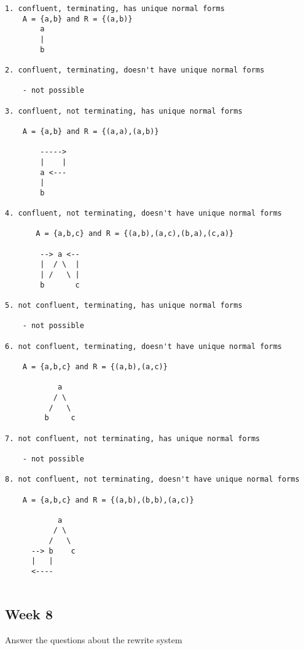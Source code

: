 \documentclass{article}
\theoremstyle{theorem}
\theoremstyle{definition}
\theoremstyle{remark}
\begin{document}
\begin{lstlisting}
1. confluent, terminating, has unique normal forms
    A = {a,b} and R = {(a,b)}
        a
        |
        b

2. confluent, terminating, doesn't have unique normal forms

    - not possible

3. confluent, not terminating, has unique normal forms

    A = {a,b} and R = {(a,a),(a,b)}
        
        ----->
        |    |
        a <---
        |
        b

4. confluent, not terminating, doesn't have unique normal forms

       A = {a,b,c} and R = {(a,b),(a,c),(b,a),(c,a)}
        
        --> a <--
        |  / \  |
        | /   \ |
        b       c

5. not confluent, terminating, has unique normal forms

    - not possible

6. not confluent, terminating, doesn't have unique normal forms

    A = {a,b,c} and R = {(a,b),(a,c)}
        
            a
           / \
          /   \
         b     c

7. not confluent, not terminating, has unique normal forms

    - not possible

8. not confluent, not terminating, doesn't have unique normal forms

    A = {a,b,c} and R = {(a,b),(b,b),(a,c)}
        
            a
           / \
          /   \
      --> b    c
      |   |
      <----


\end{lstlisting}
%

\subsection{Week 8}
Answer the questions about the rewrite system
\end{document}
